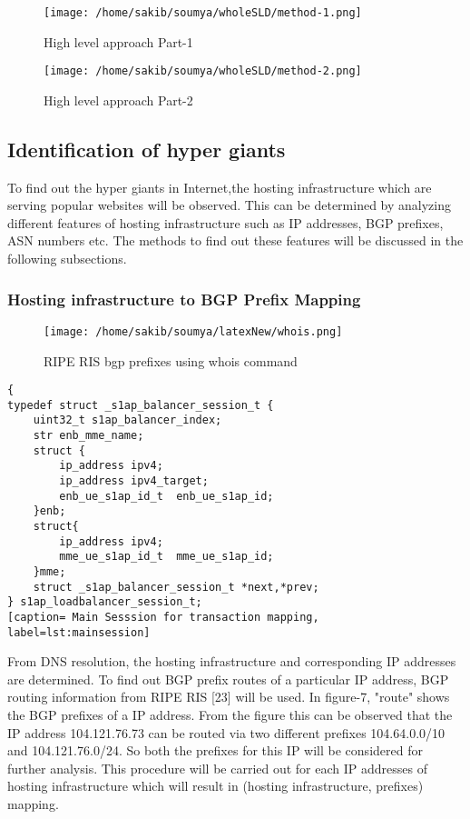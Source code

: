 \begin{figure}[h]
\texttt{[image: /home/sakib/soumya/wholeSLD/method-1.png]}
\centering
\caption{High level approach Part-1}
\end{figure}

\begin{figure}[h]
\texttt{[image: /home/sakib/soumya/wholeSLD/method-2.png]}
\centering
\caption{High level approach Part-2}
\end{figure}

\subsection{Identification of hyper giants}
To find out the hyper giants in Internet,the hosting infrastructure which are serving popular websites will be observed. This can be determined by analyzing different features of hosting infrastructure such as IP addresses, BGP prefixes, ASN numbers etc. The methods to find out these features will be discussed in the following subsections.
\subsubsection{Hosting infrastructure to BGP Prefix Mapping}
\begin{figure}[h]
\texttt{[image: /home/sakib/soumya/latexNew/whois.png]}
\centering
\caption{RIPE RIS bgp prefixes using whois command}
\end{figure}

\begin{lstlisting}
{
typedef struct _s1ap_balancer_session_t {
    uint32_t s1ap_balancer_index;
    str enb_mme_name;
    struct {
        ip_address ipv4;
        ip_address ipv4_target;
        enb_ue_s1ap_id_t  enb_ue_s1ap_id;
    }enb;
    struct{
        ip_address ipv4;
        mme_ue_s1ap_id_t  mme_ue_s1ap_id;
    }mme;
    struct _s1ap_balancer_session_t *next,*prev;
} s1ap_loadbalancer_session_t;
[caption= Main Sesssion for transaction mapping, label=lst:mainsession]
\end{lstlisting}

From DNS resolution, the hosting infrastructure and corresponding IP addresses are determined. To find out BGP prefix routes of a particular IP address, BGP routing information from RIPE RIS [23] will be used. In figure-7, "route" shows the BGP prefixes of a IP address. From the figure this can be observed that the IP address 104.121.76.73 can be routed via two different prefixes 104.64.0.0/10 and 104.121.76.0/24. So both the prefixes for this IP will be considered for further analysis. This procedure will be carried out for each IP addresses of hosting infrastructure which will result in (hosting infrastructure, prefixes) mapping.

